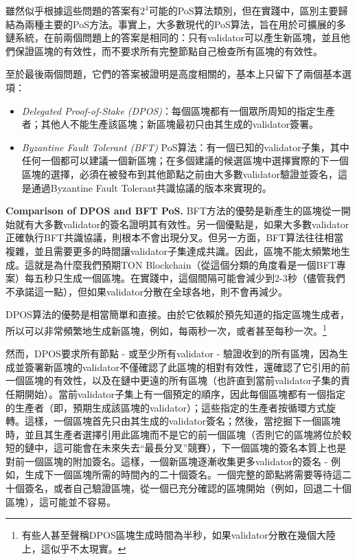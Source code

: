 \documentclass[12pt,oneside]{article}
\def\makepoint#1{\medbreak\noindent{\bf #1.\ }}
\def\nxsubpoint{\refstepcounter{subsubsection}%
  \smallbreak\makepoint{\thesubsubsection}}
\def\embt(#1.){\textbf{#1.}}
\begin{document}
雖然似乎根據這些問題的答案有$2^4$可能的PoS算法類別，但在實踐中，區別主要歸結為兩種主要的PoS方法。事實上，大多數現代的PoS算法，旨在用於可擴展的多鏈系統，在前兩個問題上的答案是相同的：只有validator可以產生新區塊，並且他們保證區塊的有效性，而不要求所有完整節點自己檢查所有區塊的有效性。

至於最後兩個問題，它們的答案被證明是高度相關的，基本上只留下了兩個基本選項：
\begin{itemize}
\item {\em Delegated Proof-of-Stake (DPOS)}：每個區塊都有一個眾所周知的指定生產者；其他人不能生產該區塊；新區塊最初只由其生成的validator簽署。
\item {\em Byzantine Fault Tolerant (BFT)} PoS算法：有一個已知的validator子集，其中任何一個都可以建議一個新區塊；在多個建議的候選區塊中選擇實際的下一個區塊的選擇，必須在被發布到其他節點之前由大多數validator驗證並簽名，這是通過Byzantine Fault Tolerant共識協議的版本來實現的。
\end{itemize}

\nxsubpoint\label{sp:dpos.bft.compare} \embt(Comparison of DPOS and
BFT PoS.) BFT方法的優勢是新產生的區塊從一開始就有大多數validator的簽名證明其有效性。另一個優點是，如果大多數validator正確執行BFT共識協議，則根本不會出現分叉。但另一方面，BFT算法往往相當複雜，並且需要更多的時間讓validator子集達成共識。因此，區塊不能太頻繁地生成。這就是為什麼我們預期TON Blockchain（從這個分類的角度看是一個BFT專案）每五秒只生成一個區塊。在實踐中，這個間隔可能會減少到2-3秒（儘管我們不承諾這一點），但如果validator分散在全球各地，則不會再減少。

DPOS算法的優勢是相當簡單和直接。由於它依賴於預先知道的指定區塊生成者，所以可以非常頻繁地生成新區塊，例如，每兩秒一次，或者甚至每秒一次。\footnote{有些人甚至聲稱DPOS區塊生成時間為半秒，如果validator分散在幾個大陸上，這似乎不太現實。}

然而，DPOS要求所有節點 - 或至少所有validator - 驗證收到的所有區塊，因為生成並簽署新區塊的validator不僅確認了此區塊的相對有效性，還確認了它引用的前一個區塊的有效性，以及在鏈中更遠的所有區塊（也許直到當前validator子集的責任期開始）。當前validator子集上有一個預定的順序，因此每個區塊都有一個指定的生產者（即，預期生成該區塊的validator）；這些指定的生產者按循環方式旋轉。這樣，一個區塊首先只由其生成的validator簽名；然後，當挖掘下一個區塊時，並且其生產者選擇引用此區塊而不是它的前一個區塊（否則它的區塊將位於較短的鏈中，這可能會在未來失去“最長分叉”競賽），下一個區塊的簽名本質上也是對前一個區塊的附加簽名。這樣，一個新區塊逐漸收集更多validator的簽名 - 例如，生成下一個區塊所需的時間內的二十個簽名。一個完整的節點將需要等待這二十個簽名，或者自己驗證區塊，從一個已充分確認的區塊開始（例如，回退二十個區塊），這可能並不容易。
\end{document}
